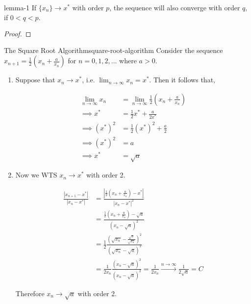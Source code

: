 \documentclass[10pt]{article}
\begin{document}
\begin{mylemma}{}{lemma-1}
    If $\{x_{n}\}\to x^*$ with order $p$, the sequence will also converge with order $q$, if $0<q<p$.
\end{mylemma}

\begin{proof}
\end{proof}

\begin{myexample}{The Square Root Algorithm}{square-root-algorithm}
    Consider the sequence $x_{n+1}= \frac{1}{2}\left(x_{n}+\frac{a}{x_{n}}\right)$ for $n=0,1,2,...$ where $a>0$. 
    \begin{enumerate}[label=(\roman*)]
        \item Suppose that $x_{n}\to x^*$, i.e. $\lim_{n\to \infty}x_{n}=x^{*}$. Then it follows that,

        \begin{align*}
            \lim_{n\to\infty}x_{n} &= \lim_{n\to\infty}\frac{1}{2}(x_{n}+\frac{a}{x_n}) \\
            \implies x^* &= \frac{1}{2}x^* + \frac{a}{2x^{*}} \\
            \implies (x^{*})^{2} &= \frac{1}{2}(x^{*})^{2} + \frac{a}{2} \\
            \implies (x^{*})^{2} &= a \\
            \implies x^{*} &= \sqrt{a}
        \end{align*}

        \item Now we WTS $x_{n}\to x^*$ with order 2. 

        \begin{align*}
            \frac{|x_{n+1}-x^*|}{|x_{n}-x^*|} &= \frac{|\frac{1}{2}(x_{n}+\frac{a}{x_n})-x^*|}{|x_{n}-x^*|^2} \\
            &= \frac{\frac{1}{2} (x_{n}+\frac{a}{x_n})-\sqrt{a} }{(x_{n}-\sqrt{a})^2} \\
            &= \frac{1}{2} \frac{\left( \sqrt{x_n} -\frac{\sqrt{a}}{\sqrt{x_n}}\right)^2}{(\sqrt{x_n}-\sqrt{a})^2} \\
            &= \frac{1}{2x_{n}} \frac{(x_{n}-\sqrt{a})^2}{(x_n -\sqrt{a})^2} =\frac{1}{2x_{n}}\xrightarrow{n\to\infty} \frac{1}{2\sqrt{a}}=C
        \end{align*}

        Therefore $x_{n}\to \sqrt{a}$ with order 2.
    \end{enumerate}
\end{myexample}
\end{document}
